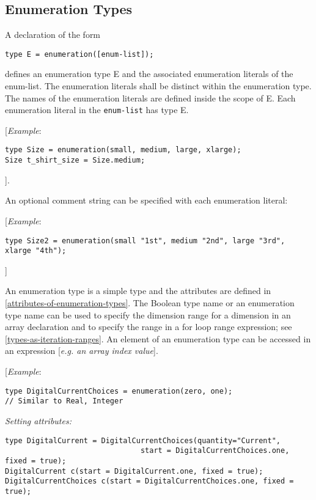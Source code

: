 \subsection{Enumeration Types}

A declaration of the form
\begin{lstlisting}[language=modelica]
type E = enumeration([enum-list]);
\end{lstlisting}

defines an enumeration type E and the associated enumeration literals of
the enum-list. The enumeration literals shall be distinct within the
enumeration type. The names of the enumeration literals are defined
inside the scope of E. Each enumeration literal in the \lstinline!enum-list! has
type E.

{[}\emph{Example}:
\begin{lstlisting}[language=modelica]
type Size = enumeration(small, medium, large, xlarge);
Size t_shirt_size = Size.medium;
\end{lstlisting}

{]}.

An optional comment string can be specified with each enumeration
literal:

{[}\emph{Example}:
\begin{lstlisting}[language=modelica]
type Size2 = enumeration(small "1st", medium "2nd", large "3rd", xlarge "4th");
\end{lstlisting}

{]}

An enumeration type is a simple type and the attributes are defined in
\autoref{attributes-of-enumeration-types}. The Boolean type name or an enumeration type name can
be used to specify the dimension range for a dimension in an array
declaration and to specify the range in a for loop range expression; see
\autoref{types-as-iteration-ranges}. An element of an enumeration type can be accessed in
an expression {[}\emph{e.g. an array index value}{]}.

{[}\emph{Example}:
\begin{lstlisting}[language=modelica]
type DigitalCurrentChoices = enumeration(zero, one);
// Similar to Real, Integer
\end{lstlisting}

\emph{Setting attributes: }
\begin{lstlisting}[language=modelica]
type DigitalCurrent = DigitalCurrentChoices(quantity="Current",
                               start = DigitalCurrentChoices.one, fixed = true);
DigitalCurrent c(start = DigitalCurrent.one, fixed = true);
DigitalCurrentChoices c(start = DigitalCurrentChoices.one, fixed = true);
\end{lstlisting}


